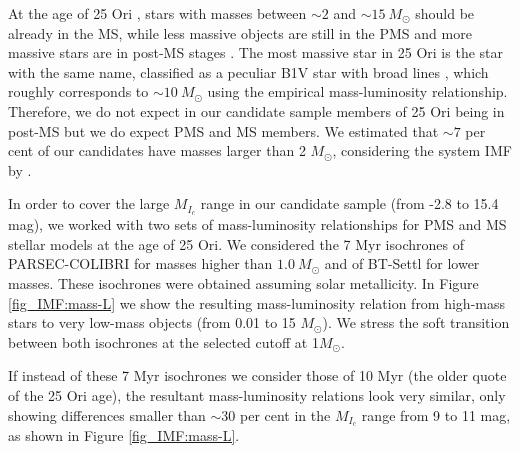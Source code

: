 \documentclass[12pt]{article}
\newcounter{subsubsubsection}[subsubsection]
\begin{document}
\label{sec_IMF:mass-luminosity}

At the age of 25 Ori \citep[7-10 Myr; ][]{Briceno2005,Briceno2007,Downes2014,Briceno2018}, stars with masses between $\sim 2$ and $\sim 15\ M_\odot$ should be already in the MS, while less massive objects are still in the PMS and more massive stars are in post-MS stages \citep[][]{Prialnik2000}. The most massive star in 25 Ori is the star with the same name, classified as a peculiar B1V star with broad lines \citep{Houk1999}, which roughly corresponds to $\sim 10\ M_\odot$ using the \citet{Schmidt-Kaler1982} empirical mass-luminosity relationship. Therefore, we do not expect in our candidate sample members of 25 Ori being in post-MS but we do expect PMS and MS members. We estimated that $\sim7$ per cent of our candidates have masses larger than 2 $M_\odot$, considering the system IMF by \citet{Downes2014}.

In order to cover the large $M_{I_c}$ range in our candidate sample (from -2.8 to 15.4 mag), we worked with two sets of mass-luminosity relationships for PMS and MS stellar models at the age of 25 Ori. We considered the 7 Myr isochrones of PARSEC-COLIBRI for masses higher than $1.0\ M_\odot$ and of BT-Settl for lower masses. These isochrones were obtained assuming solar metallicity. In Figure \ref{fig_IMF:mass-L} we show the resulting mass-luminosity relation from high-mass stars to very low-mass objects (from 0.01 to 15 $M_\odot$). We stress the soft transition between both isochrones at the selected cutoff at 1$M_\odot$. 

If instead of these 7 Myr isochrones we consider those of 10 Myr (the older quote of the 25 Ori age), the resultant mass-luminosity relations look very similar, only showing differences smaller than $\sim 30$ per cent in the $M_{I_c}$ range from 9 to 11 mag, as shown in Figure \ref{fig_IMF:mass-L}.
\end{document}
